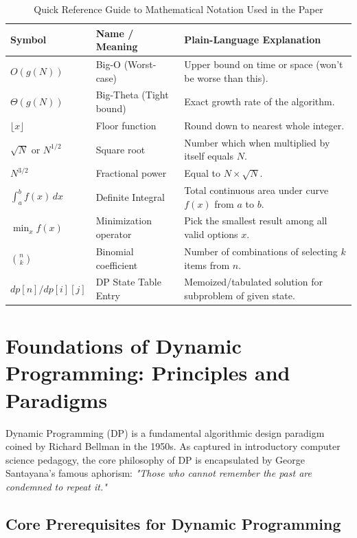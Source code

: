 \documentclass[10pt,journal,compsoc,onecolumn]{IEEEtran}
\begin{document}
\begin{table}[htbp]
\centering
\caption{Quick Reference Guide to Mathematical Notation Used in the Paper}
\label{tab:math-symbols}
\begin{tabular}{lll}
\toprule
\textbf{Symbol} & \textbf{Name / Meaning} & \textbf{Plain-Language Explanation} \\
\midrule
$O(g(N))$ & Big-O (Worst-case) & Upper bound on time or space (won't be worse than this). \\
$\Theta(g(N))$ & Big-Theta (Tight bound) & Exact growth rate of the algorithm. \\
$\lfloor x \rfloor$ & Floor function & Round down to nearest whole integer. \\
$\sqrt{N}$ or $N^{1/2}$ & Square root & Number which when multiplied by itself equals $N$. \\
$N^{3/2}$ & Fractional power & Equal to $N \times \sqrt{N}$. \\
$\int_{a}^{b} f(x) \, dx$ & Definite Integral & Total continuous area under curve $f(x)$ from $a$ to $b$. \\
$\min_{x} f(x)$ & Minimization operator & Pick the smallest result among all valid options $x$. \\
$\binom{n}{k}$ & Binomial coefficient & Number of combinations of selecting $k$ items from $n$. \\
$dp[n] / dp[i][j]$ & DP State Table Entry & Memoized/tabulated solution for subproblem of given state. \\
\bottomrule
\end{tabular}
\end{table}


\section{Foundations of Dynamic Programming: Principles and Paradigms}
\label{sec:dp-foundations}

Dynamic Programming (DP) is a fundamental algorithmic design paradigm coined by Richard Bellman in the 1950s. As captured in introductory computer science pedagogy, the core philosophy of DP is encapsulated by George Santayana's famous aphorism: \emph{"Those who cannot remember the past are condemned to repeat it."}

\subsection{Core Prerequisites for Dynamic Programming}
\end{document}
